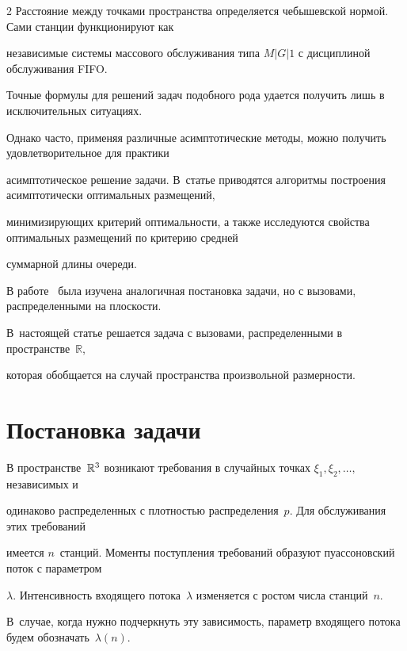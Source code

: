 \begin{multicols}{2}
Расстояние между точками пространства определяется чебышевской нормой. Сами станции функционируют как 


независимые системы массового обслуживания типа $M|G|1$ с дисциплиной обслуживания FIFO.





Точные формулы для решений задач подобного рода удается получить лишь в исключительных ситуациях. 


Однако часто, применяя различные асимптотические методы, можно получить удовлетворительное для практики 


асимптотическое решение задачи. В~статье приводятся алгоритмы построения асимптотически оптимальных размещений, 


минимизирующих критерий оптимальности, а также исследуются свойства оптимальных размещений по критерию средней 


суммарной длины очереди.





В работе~\cite{3mat} была изучена аналогичная постановка задачи, но с вызовами, распределенными на плоскости. 


В~настоящей статье решается задача с вызовами, распределенными в пространстве~$\mathbb{R}$, 


которая обобщается на случай пространства произвольной размерности.





\section{Постановка задачи}





В пространстве~${\mathbb{R}}^3$ возникают требования в случайных точках $\xi_1,\xi_2,\dots,$ независимых и


одинаково распределенных с плотностью распределения~$p$. Для обслуживания этих требований


имеется $n$~станций. Моменты поступления требований образуют пуассоновский поток с параметром


$\lambda$. Интенсивность входящего потока~$\lambda$ изменяется с ростом чис\-ла станций~$n$. 


В~случае, когда нужно подчеркнуть эту зависимость, параметр входящего потока будем обозначать~$\lambda(n)$.






\end{multicols}
